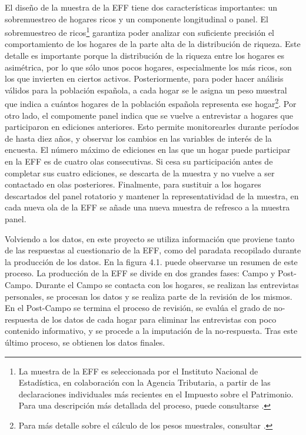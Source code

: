 El diseño de la muestra de la EFF tiene dos características importantes: un sobremuestreo de hogares ricos y un componente longitudinal o panel. El sobremuestreo de ricos\footnote{La muestra de la EFF es seleccionada por el Instituto Nacional de Estadística, en colaboración con la Agencia Tributaria, a partir de las declaraciones individuales más recientes en el Impuesto sobre el Patrimonio. Para una descripción más detallada del proceso, puede consultarse \cite{effmethod2017}.} garantiza poder analizar con suficiente precisión el comportamiento de los hogares de la parte alta de la distribución de riqueza. Este detalle es importante porque la distribución de la riqueza entre los hogares es asimétrica, por lo que sólo unos pocos hogares, especialmente los más ricos, son los que invierten en ciertos activos. Posteriormente, para poder hacer análisis válidos para la población española, a cada hogar se le asigna un peso muestral que indica a cuántos hogares de la población española representa ese hogar\footnote{Para más detalle sobre el cálculo de los pesos muestrales, consultar \cite{effmethod2002}.}. Por otro lado, el compomente panel indica que se vuelve a entrevistar a hogares que participaron en ediciones anteriores. Esto permite monitorearles durante períodos de hasta diez años, y observar los cambios en las variables de interés de la encuesta. El número máximo de ediciones en las que un hogar puede participar en la EFF es de cuatro olas consecutivas. Si cesa su participación antes de completar sus cuatro ediciones, se descarta de la muestra y no vuelve a ser contactado en olas posteriores. Finalmente, para sustituir a los hogares descartados del panel rotatorio y mantener la representatividad de la muestra, en cada nueva ola de la EFF se añade una nueva muestra de refresco a la muestra panel.

Volviendo a los datos, en este proyecto se utiliza información que proviene tanto de las respuestas al cuestionario de la EFF, como del paradata recopilado durante la producción de los datos. En la figura 4.1. puede observarse un resumen de este proceso. La producción de la EFF se divide en dos grandes fases: Campo y Post-Campo. Durante el Campo se contacta con los hogares, se realizan las entrevistas personales, se procesan los datos y se realiza parte de la revisión de los mismos. En el Post-Campo se termina el proceso de revisión, se evalúa el grado de no-respuesta de los datos de cada hogar para eliminar las entrevistas con poco contenido informativo, y se procede a la imputación de la no-respuesta. Tras este último proceso, se obtienen los datos finales.

